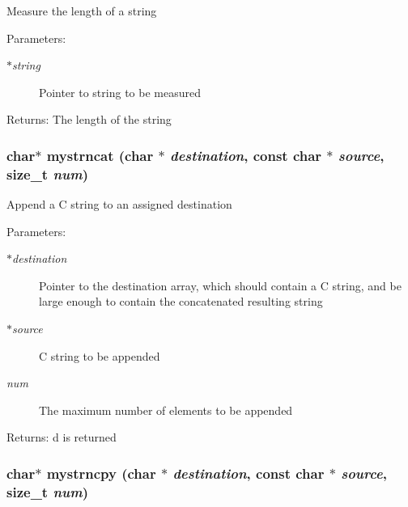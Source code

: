 Measure the length of a string \begin{Desc}
\item[Parameters:]
\begin{description}
\item[{\em $\ast$string}]Pointer to string to be measured \end{description}
\end{Desc}
\begin{Desc}
\item[Returns:]The length of the string \end{Desc}
\subsubsection{\setlength{\rightskip}{0pt plus 5cm}char$\ast$ mystrncat (char $\ast$ {\em destination}, const char $\ast$ {\em source}, size\_\-t {\em num})}\label{mystring_8h_c2070ea5031f58dcfcc4320a1d6beb75}


Append a C string to an assigned destination \begin{Desc}
\item[Parameters:]
\begin{description}
\item[{\em $\ast$destination}]Pointer to the destination array, which should contain a C string, and be large enough to contain the concatenated resulting string \item[{\em $\ast$source}]C string to be appended \item[{\em num}]The maximum number of elements to be appended \end{description}
\end{Desc}
\begin{Desc}
\item[Returns:]d is returned \end{Desc}
\subsubsection{\setlength{\rightskip}{0pt plus 5cm}char$\ast$ mystrncpy (char $\ast$ {\em destination}, const char $\ast$ {\em source}, size\_\-t {\em num})}\label{mystring_8h_858f7c088b124224c6358aee22118bc9}


